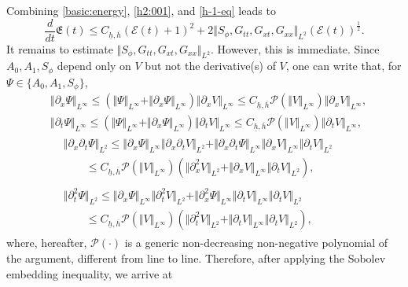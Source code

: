 \documentclass[reqno,11pt]{amsart}
\newcommand{\norm}[2]{\Vert #1 \Vert_{#2}}
\theoremstyle{plain}
\theoremstyle{definition}
\numberwithin{equation}{section}
\begin{document}
Combining \eqref{basic:energy}, \eqref{h2:001}, and \eqref{h-1-eq} leads to
\begin{equation}
    \label{h-002}
    \dfrac{d}{dt}\mathfrak E(t)\leq C_{\underline h, \overline h} (\mathcal E(t) + 1)^2 + 2 \norm{S_\phi,G_{tt},G_{xt},G_{xx}}{L^2} (\mathcal E(t))^{\frac{1}{2}}.
\end{equation}
It remains to estimate $ \norm{S_\phi,G_{tt},G_{xt},G_{xx}}{L^2} $. However, this is immediate. Since $ A_0, A_1, S_\phi $ depend only on $ V $ but not the derivative(s) of $ V $, one can write that, for $ \Psi \in \lbrace A_0, A_1, S_\phi \rbrace $, 
\begin{align}
    \label{est:nonlinearity-001}
    & \norm{\partial_x \Psi}{L^\infty} \leq (\norm{\Psi}{L^{\infty}}+\norm{ \partial_x \Psi }{L^\infty}) \norm{\partial_x V}{L^\infty} \leq C_{\underline h,\overline h} \mathcal P(\norm{V}{L^\infty}) \norm{\partial_x V}{L^\infty}, \\
    & \norm{\partial_t \Psi}{L^\infty} \leq (\norm{\Psi}{L^{\infty}}+\norm{ \partial_x \Psi }{L^\infty}) \norm{\partial_t V}{L^\infty} \leq C_{\underline h,\overline h} \mathcal P(\norm{V}{L^\infty}) \norm{\partial_t V}{L^\infty}, \\
    & \label{est:nonlinearity-003} \begin{aligned}& \norm{\partial_{x}\partial_t \Psi}{L^2} \leq \norm{\partial_x \Psi}{L^\infty} \norm{\partial_{x}\partial_t V}{L^2} + \norm{\partial_{x}\partial_t\Psi}{L^\infty} \norm{\partial_x V}{L^\infty}\norm{\partial_t V}{L^2} \\
    & \qquad \leq C_{\underline h, \overline h} \mathcal P(\norm{V}{L^\infty}) (\norm{\partial_{x}^2 V}{L^2} + \norm{\partial_x V}{L^\infty}\norm{\partial_t V}{L^2} ),
    \end{aligned}\\
    & \label{est:nonlinearity-004} \begin{aligned}& \norm{\partial_{t}^2 \Psi}{L^2} \leq \norm{\partial_x \Psi}{L^\infty} \norm{\partial_{t}^2 V}{L^2} + \norm{\partial_{x}^2\Psi}{L^\infty} \norm{\partial_t V}{L^\infty}\norm{\partial_t V}{L^2} \\
    & \qquad \leq C_{\underline h, \overline h} \mathcal P(\norm{V}{L^\infty}) (\norm{\partial_{t}^2 V}{L^2} + \norm{\partial_t V}{L^\infty}\norm{\partial_t V}{L^2} ),
    \end{aligned}
\end{align}
where, hereafter, $\mathcal{P}(\cdot) $ is a generic non-decreasing non-negative polynomial of the argument, different from line to line. Therefore, after applying the Sobolev embedding inequality, we arrive at
\end{document}
